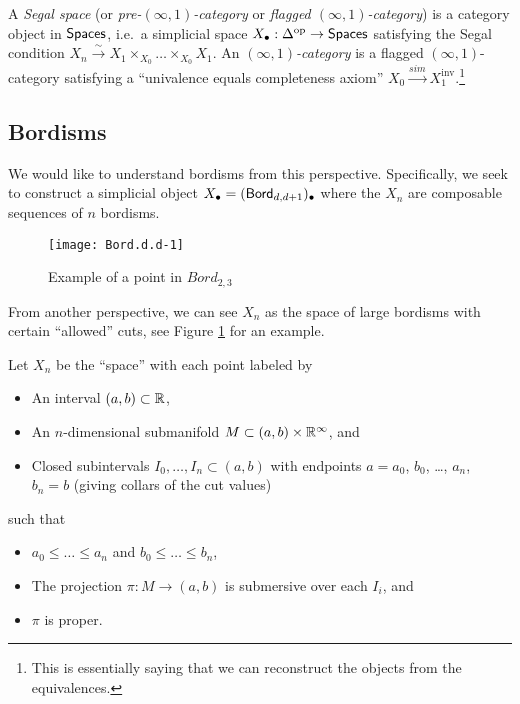 \begin{dfn}
	A \emph{Segal space} (or \emph{pre-$(\infty, 1)$-category} or \emph{flagged $(\infty, 1)$-category}) is a category object in $\mathsf{Spaces}$, i.e.\ a simplicial space $X_\bullet: \Delta^{\mathrm{op}} \to \mathsf{Spaces}$ satisfying the Segal condition $X_n \xrightarrow{\sim} X_1 \times_{X_0} \dots \times_{X_0} X_1$.
	An \emph{$(\infty, 1)$-category} is a flagged $(\infty, 1)$-category satisfying a ``univalence equals completeness axiom'' $X_0 \xrightarrow{sim} X_1^{\textrm{inv}}$.\footnote{This is essentially saying that we can reconstruct the objects from the equivalences.}
\end{dfn}

\subsection{Bordisms}

We would like to understand bordisms from this perspective.
Specifically, we seek to construct a simplicial object $X_\bullet = (\mathsf{Bord}_{d,d+1})_\bullet$ where the $X_n$ are composable sequences of $n$ bordisms.
\begin{figure}[h]
\centering
\texttt{[image: Bord.d.d-1]}
\caption{Example of a point in $Bord_{2,3}$}
\label{fig:Bord.d.d+1}
\end{figure}

From another perspective, we can see $X_n$ as the space of large bordisms with certain ``allowed'' cuts, see Figure \ref{fig:Bord.d.d+1} for an example.

\begin{dfn}
	Let $X_n$ be the ``space'' with each point labeled by
	\begin{itemize}
		\item An interval $(a, b) \subset \mathbb{R}$,
		\item An $n$-dimensional submanifold $M \subset (a, b) \times \mathbb{R}^{\infty}$, and
		\item Closed subintervals $I_0, \dots, I_n \subset (a, b)$ with endpoints $a = a_0$, $b_0$, \dots, $a_n$, $b_n = b$ (giving collars of the cut values)
	\end{itemize}
	such that
	\begin{itemize}
		\item $a_0 \leq \dots \leq a_n$ and $b_0 \leq \dots \leq b_n$,
		\item The projection $\pi: M \to (a, b)$ is submersive over each $I_i$, and
		\item $\pi$ is proper.
	\end{itemize}
\end{dfn}

